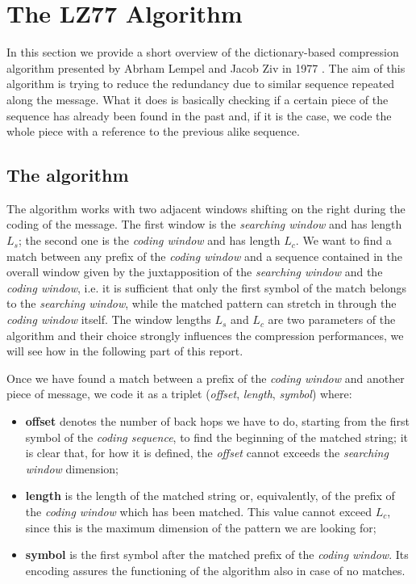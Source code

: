 \section{The LZ77 Algorithm} \label{sec:lz77}
In this section we provide a short overview of the dictionary-based compression algorithm presented by Abrham Lempel and Jacob Ziv in 1977 \cite{ziv1}. The aim of this algorithm is trying to reduce the redundancy due to similar sequence repeated along the message. What it does is basically checking if a certain piece of the sequence has already been found in the past and, if it is the case, we code the whole piece with a reference to the previous alike sequence.

\subsection{The algorithm} \label{subsec:lz77alg}
The algorithm works with two adjacent windows shifting on the right during the coding of the message. The first window is the \textit{searching window} and has length $L_s$; the second one is the \textit{coding window} and has length $L_c$. We want to find a match between any prefix of the \textit{coding window} and a sequence contained in the overall window given by the juxtapposition of the \textit{searching window} and the \textit{coding window}, i.e. it is sufficient that only the first symbol of the match belongs to the \textit{searching window}, while the matched pattern can stretch in through the \textit{coding window} itself. The window lengths $L_s$ and $L_c$ are two parameters of the algorithm and their choice strongly influences the compression performances, we will see how in the following part of this report.
 
Once we have found a match between a prefix of the \textit{coding window} and another piece of message, we code it as a triplet (\textit{offset}, \textit{length}, \textit{symbol}) where:
\begin{itemize}
\item
\textbf{offset} denotes the number of back hops we have to do, starting from the first symbol of the \textit{coding sequence}, to find the beginning of the matched string; it is clear that, for how it is defined, the \textit{offset} cannot exceeds the \textit{searching window} dimension;

\item
\textbf{length} is the length of the matched string or, equivalently, of the prefix of the \textit{coding window} which has been matched. This value cannot exceed $L_c$, since this is the maximum dimension of the pattern we are looking for;

\item
\textbf{symbol} is the first symbol after the matched prefix of the \textit{coding window}. Its encoding assures the functioning of the algorithm also in case of no matches. 
\end{itemize}

